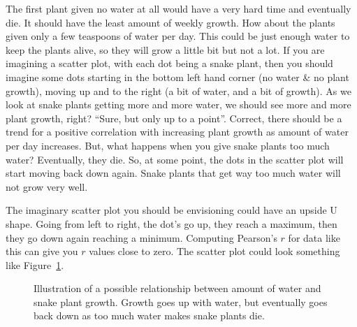 \documentclass[
  letterpaper,
  DIV=11,
  numbers=noendperiod]{scrreprt}
\begin{document}
The first plant given no water at all would have a very hard time and
eventually die. It should have the least amount of weekly growth. How
about the plants given only a few teaspoons of water per day. This could
be just enough water to keep the plants alive, so they will grow a
little bit but not a lot. If you are imagining a scatter plot, with each
dot being a snake plant, then you should imagine some dots starting in
the bottom left hand corner (no water \& no plant growth), moving up and
to the right (a bit of water, and a bit of growth). As we look at snake
plants getting more and more water, we should see more and more plant
growth, right? ``Sure, but only up to a point''. Correct, there should
be a trend for a positive correlation with increasing plant growth as
amount of water per day increases. But, what happens when you give snake
plants too much water? Eventually, they die. So, at some point, the dots
in the scatter plot will start moving back down again. Snake plants that
get way too much water will not grow very well.

The imaginary scatter plot you should be envisioning could have an
upside U shape. Going from left to right, the dot's go up, they reach a
maximum, then they go down again reaching a minimum. Computing Pearson's
\(r\) for data like this can give you \(r\) values close to zero. The
scatter plot could look something like Figure~\ref{fig-3snakeplant}.

\begin{figure}


\caption{\label{fig-3snakeplant}Illustration of a possible relationship
between amount of water and snake plant growth. Growth goes up with
water, but eventually goes back down as too much water makes snake
plants die.}

\end{figure}%
\end{document}
